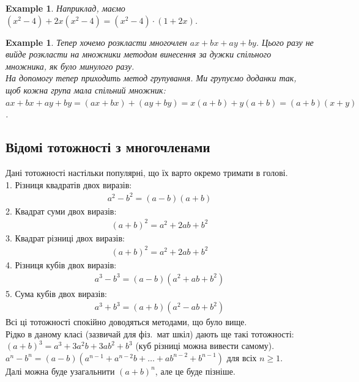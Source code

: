 \documentclass[a4paper, 10pt]{article}
\theoremstyle{theoremdd}
\theoremstyle{theoremdd}
\theoremstyle{theoremdd}
\theoremstyle{theoremdd}
\newtheorem{example}[theorem]{Example}
\theoremstyle{theoremdd}
\theoremstyle{theoremdd}
\theoremstyle{theoremdd}
\theoremstyle{theoremdd}
\begin{document}
\begin{example}
Наприклад, маємо $(x^2 - 4) + 2x (x^2 - 4) = (x^2 - 4) \cdot (1 + 2x)$.
\end{example}

\begin{example}
Тепер хочемо розкласти многочлен $ax + bx + ay + by$. Цього разу не вийде розкласти на множники методом винесення за дужки спільного множника, як було минулого разу.\\
На допомогу тепер приходить метод групування. Ми групуємо доданки так, щоб кожна група мала спільний множник:\\
$ax + bx + ay + by = (ax + bx) + (ay + by) = x(a+b) + y(a+b) = (a+b)(x+y)$.
\end{example}

\subsection*{Відомі тотожності з многочленами}
Дані тотожності настільки популярні, що їх варто окремо тримати в голові.\\
1. Різниця квадратів двох виразів:
\begin{align*}
a^2 - b^2 = (a-b)(a+b)
\end{align*}
2. Квадрат суми двох виразів:
\begin{align*}
(a + b)^2 = a^2 + 2ab + b^2
\end{align*}
3. Квадрат різниці двох виразів:
\begin{align*}
(a + b)^2 = a^2 + 2ab + b^2
\end{align*}
4. Різниця кубів двох виразів:
\begin{align*}
a^3 - b^3 = (a - b)(a^2 + ab + b^2)
\end{align*}
5. Сума кубів двох виразів:
\begin{align*}
a^3 + b^3 = (a + b)(a^2 - ab + b^2)
\end{align*}
Всі ці тотожності спокійно доводяться методами, що було вище.\\
Рідко в даному класі (зазвичай для фіз.\ мат шкіл) дають ще такі тотожності:\\
$(a+b)^3 = a^3 + 3a^2b + 3ab^2 + b^3$ (куб різниці можна вивести самому).\\
$a^n - b^n = (a-b)(a^{n-1}+a^{n-2} b + \dots + a b^{n-2} + b^{n-1})$ для всіх $n \geq 1$.
\bigskip \\
Далі можна буде узагальнити $(a+b)^n$, але це буде пізніше.
\newpage

\end{document}
